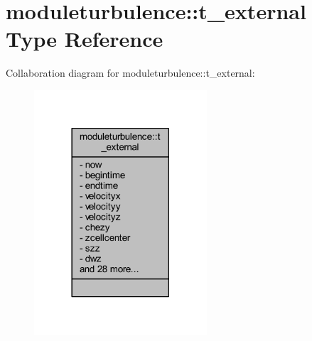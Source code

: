\hypertarget{structmoduleturbulence_1_1t__external}{}\section{moduleturbulence\+:\+:t\+\_\+external Type Reference}
\label{structmoduleturbulence_1_1t__external}


Collaboration diagram for moduleturbulence\+:\+:t\+\_\+external\+:\nopagebreak
\begin{figure}[H]
\begin{center}
\leavevmode
\includegraphics[width=182pt]{structmoduleturbulence_1_1t__external__coll__graph}
\end{center}
\end{figure}
